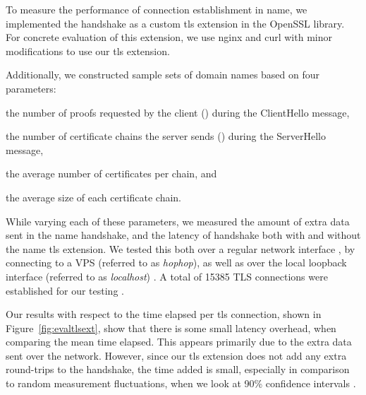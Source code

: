 
To measure the  
performance of connection establishment in \ac{name}, we
implemented the handshake as a custom \ac{tls} extension in the
OpenSSL library. For concrete evaluation of this extension, we use
nginx and curl with minor modifications to use our \ac{tls} extension.

Additionally, we constructed sample sets of domain names based
on four parameters:
\begin{inparaenum}
\item the number of proofs requested by the client (\numlas) during the ClientHello message,
\item the number of certificate chains the server   sends (\policy) during the ServerHello message,
\item the average number of certificates per chain, and
\item the average size of each certificate chain.
\end{inparaenum}
While varying each of these parameters, we measured the amount of
extra data sent in the \ac{name} handshake, and the latency of
handshake both with and without
the \ac{name} \ac{tls} extension. We
tested this both over a regular network interface
, by connecting to a
VPS  (referred to as \emph{hophop}), as well as over the local loopback
interface (referred to as \emph{localhost}) .
A total of 15385 TLS connections were established for our testing .

Our results with respect to the time elapsed per \ac{tls} connection,
shown in Figure~\ref{fig:evaltlsext}, show that there is some
small
latency overhead, when comparing the mean time elapsed. This appears
primarily due to
the extra data
sent over the network. However, since
our \ac{tls} extension does not add any extra round-trips to the
handshake, the time added is small, especially in comparison to random
measurement fluctuations, when we look at 90\% confidence intervals
.

